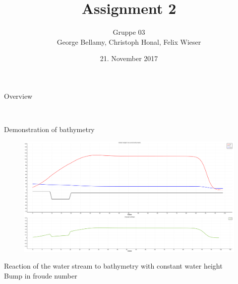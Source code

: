 \documentclass[shortpres]{beamer}
\title[{Tsunami simulation}]{Assignment 2}
\author[Bellamy, Honal, Wieser]{Gruppe 03\\George Bellamy, Christoph Honal, Felix Wieser\\\vspace{10pt}{\small Bachelorpraktikum}}
\institute[TU M\"unchen]{Technical University of Munich}
\date{21. November 2017}
\newcommand{\imgfullscale}{0.75}
\begin{document}
\maketitle


\begin{frame}{Overview}
	\begin{figure}
		\hspace{40pt}
		\hspace{0pt}\vspace{20pt}\\
	\end{figure}
\end{frame}


\begin{frame}{Demonstration of bathymetry}
	\begin{figure}
		\includegraphics[clip, width=\imgfullscale\linewidth]{img/Bathymetry_simple.png}
	\end{figure}
	Reaction of the water stream to bathymetry with constant water height\\
	Bump in froude number
\end{frame}
\end{document}
